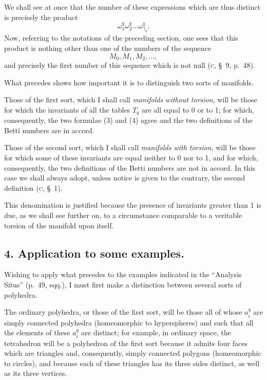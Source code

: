 \documentclass{article}
\begin{document}
We shall see at once that the number of these expressions which are thus distinct is precisely the product
\[ \omega^{q}_{1} \omega^{q}_{2} \ldots \omega^{q}_{\gamma_{q}}. \]
Now, referring to the notations of the preceding section, one sees that this product is nothing other than one of the numbers of the sequence
\[ M_{0}, M_{1}, M_{2}, \ldots, \]
and precisely the first number of this sequence which is not null (\textsc{c}, \S~9, p.\ 48).

What precedes shows how important it is to distinguish two sorts of manifolds.

Those of the first sort, which I shall call \emph{manifolds without torsion}, will be those for which the invariants of all the tables $T_{q}$ are all equal to 0 or to 1; for which, consequently, the two formulae (3) and (4) agree and the two definitions of the Betti numbers are in accord.

Those of the second sort, which I shall call \emph{manifolds with torsion}, will be those for which some of these invariants are equal neither to 0 nor to 1, and for which, consequently, the two definitions of the Betti numbers are not in accord. In this case we shall always adopt, unless notice is given to the contrary, the second definition (\textsc{c}, \S~1).

This denomination is justified because the presence of invariants greater than 1 is due, as we shall see further on, to a circumstance comparable to a veritable torsion of the manifold upon itself.

\subsection*{4. Application to some examples.}

Wishing to apply what precedes to the examples indicated in the “Analysis Situs” (p.\ 49, sqq.), I must first make a distinction between several sorts of polyhedra.

The ordinary polyhedra, or those of the first sort, will be those all of whose $a^{q}_{i}$ are simply connected polyhedra (homeomorphic to hyperspheres) and such that all the elements of these $a^{q}_{i}$ are distinct; for example, in ordinary space, the tetrahedron will be a polyhedron of the first sort because it admits four faces which are triangles and, consequently, simply connected polygons (homeomorphic to circles), and because each of these triangles has its three sides distinct, as well as its three vertices.
\end{document}
